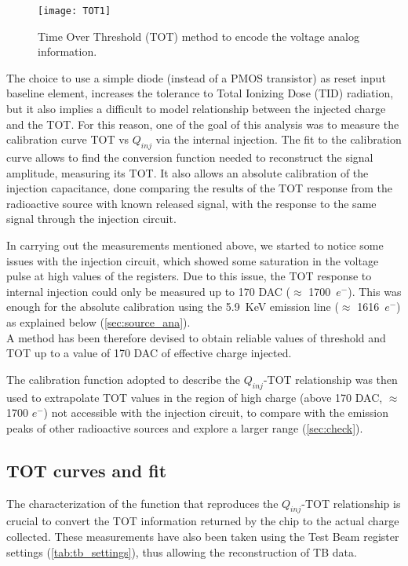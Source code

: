 \begin{figure}[h!]
\centering
\texttt{[image: TOT1]}
\caption{Time Over Threshold (TOT) method to encode the voltage analog information.}
\label{fig:ToT}
\end{figure}

The choice to use a simple diode (instead of a PMOS transistor) as reset input baseline element, increases the tolerance to Total Ionizing Dose (TID) radiation, but it also implies a difficult to model relationship between the injected charge and the TOT. For this reason, one of the goal of this analysis was to measure the calibration curve TOT vs $Q_{inj}$ via the internal injection. The fit to the calibration curve allows to find the conversion function needed to reconstruct the signal amplitude, measuring its TOT. It also allows an absolute calibration of the injection capacitance, done comparing the results of the TOT response from the radioactive source with known released signal, with the response to the same signal through the injection circuit.

In carrying out the measurements mentioned above, we started to notice some issues with the injection circuit, which showed some saturation in the voltage pulse at high values of the registers. Due to this issue, the TOT response to internal injection could only be measured up to 170 DAC ($\approx$ 1700~$e^{-}$). This was enough for the absolute calibration using the  \SI{5.9}{KeV} emission line ($\approx$ 1616~$e^{-}$) as explained below (\autoref{sec:source_ana}).\\
A method has been therefore devised to obtain reliable values of threshold and TOT up to a value of 170 DAC of effective charge injected.

The calibration function adopted to describe the $Q_{inj}$-TOT relationship was then used to extrapolate TOT values in the region of high charge (above 170 DAC, $\approx$ 1700 $e^{-}$) not accessible with the injection circuit, to compare with the emission peaks of other radioactive sources and explore a larger range (\autoref{sec:check}).


\subsection{TOT curves and fit} \label{sec:tot_fit}

The characterization of the function that reproduces the $Q_{inj}$-TOT relationship is crucial to convert the TOT information returned by the chip to the actual charge collected. These measurements have also been taken using the Test Beam register settings (\autoref{tab:tb_settings}), thus allowing the reconstruction of TB data.

